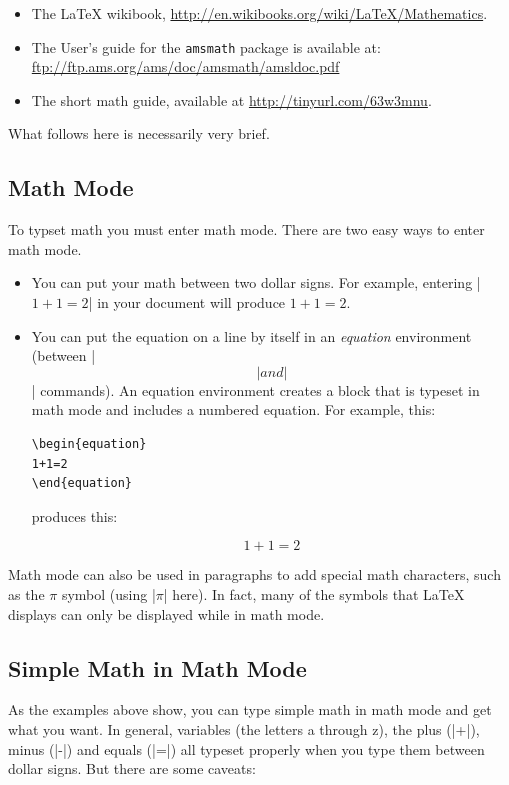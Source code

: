 \begin{itemize}
\item The \LaTeX{} wikibook,
  \url{http://en.wikibooks.org/wiki/LaTeX/Mathematics}.  
\item The User's guide for the \texttt{amsmath} package is available at:
\url{ftp://ftp.ams.org/ams/doc/amsmath/amsldoc.pdf}
\item The short math guide, available at
  \url{http://tinyurl.com/63w3mnu}.
\end{itemize}

What follows here is necessarily very brief. 

\subsection{Math Mode}
To typset math you must enter math mode. There are two easy ways to
enter math mode. 

\begin{itemize}
\item You can put your math between two dollar signs. For example,
  entering |$1+1=2$| in your document will produce $1+1=2$.
\item You can put the equation on a line by itself in an \emph{equation}
  environment (\eg between |\begin{equation}| and |\end{equation}|
  commands). An equation environment creates a block that is typeset in
  math mode and includes a numbered equation. For example, this:
\begin{Verbatim}
\begin{equation}
1+1=2
\end{equation}
\end{Verbatim}

produces this:

\begin{equation}
1+1=2
\end{equation}
\end{itemize}

Math mode can also be used in paragraphs to add special math characters, such as the $\pi$ symbol (using |$\pi$| here).
In fact, many of the symbols that \LaTeX{} displays can only be
displayed while in math mode.

\subsection{Simple Math in Math Mode}
As the examples above show, you can type simple math in
math mode and get what you want. In general, variables (the letters a
through z), the plus (|+|), minus (|-|) and equals (|=|) all 
typeset properly when you type them between dollar signs.  But there are some caveats:

